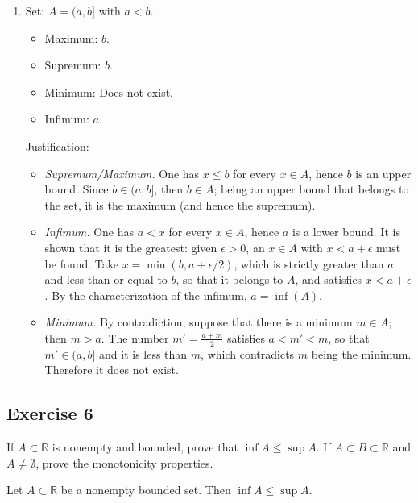 \documentclass[11pt, a4paper]{article}
\begin{document}
\begin{enumerate}
    \item Set: $A = (a, b]$ with $a < b$.
    
    \begin{itemize}
        \item Maximum: $b$.
        \item Supremum: $b$.
        \item Minimum: Does not exist.
        \item Infimum: $a$.
    \end{itemize}

    Justification:
    \begin{itemize}
        \item \textit{Supremum/Maximum.} One has $x \le b$ for every $x \in A$, hence $b$ is an upper
        bound. Since $b \in (a, b]$, then $b \in A$; being an upper bound that belongs to the
        set, it is the maximum (and hence the supremum).

        \item \textit{Infimum.} One has $a < x$ for every $x \in A$, hence $a$ is a lower bound.
        It is shown that it is the greatest: given $\epsilon > 0$, an $x \in A$ with $x < a + \epsilon$ must be found.
        Take $x = \min(b, a + \epsilon/2)$, which is strictly greater than $a$ and less than or equal to
        $b$, so that it belongs to $A$, and satisfies $x < a + \epsilon$. By the characterization of the infimum,
        $a = \inf(A)$.

        \item \textit{Minimum.} By contradiction, suppose that there is a minimum $m \in A$; then
        $m > a$. The number
        $m' = \frac{a+m}{2}$ satisfies $a < m' < m$, so that $m' \in (a, b]$ and it is less than $m$, which
        contradicts $m$ being the minimum. Therefore it does not exist.
    \end{itemize}
\end{enumerate}

\subsection*{Exercise 6}

If $A \subset \mathbb{R}$ is nonempty and bounded, prove that $\inf A \le \sup A$.
If $A \subset B \subset \mathbb{R}$ and $A \neq \emptyset$, prove the monotonicity properties.

\begin{proposicion}{}{}
Let $A \subset \mathbb{R}$ be a nonempty bounded set. Then $\inf A \le \sup A$.
\end{proposicion}
\end{document}
